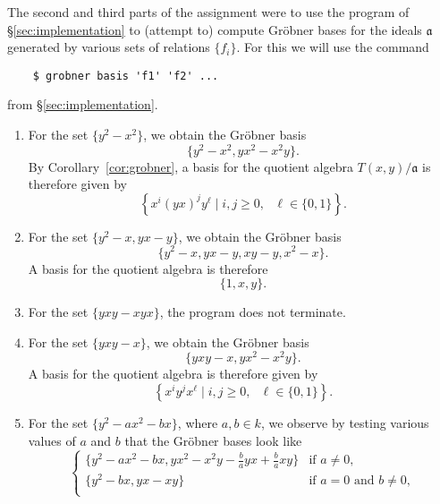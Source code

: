 The second and third parts of the assignment were to use the program of \S\ref{sec:implementation} to (attempt to) compute Gr\"obner bases for the ideals $\mathfrak{a}$ generated by various sets of relations $\{f_i\}$. For this we will use the command
\begin{verbatim}
	$ grobner basis 'f1' 'f2' ...
\end{verbatim}
from \S\ref{sec:implementation}.

\begin{enumerate}
	\item For the set $\{y^2-x^2\}$, we obtain the Gr\"obner basis
	\begin{equation*}
		\{y^2-x^2,yx^2-x^2y\}.
	\end{equation*}
    By Corollary~\ref{cor:grobner}, a basis for the quotient algebra $T(x,y)/\mathfrak{a}$ is therefore given by
    \begin{equation}
      \label{eqn:basisone}
    \left\{x^i(yx)^jy^\ell\mid i,j\ge 0,\text{ }\ell\in\{0,1\}\right\}.
    \end{equation}
	\item For the set $\{y^2-x,yx-y\}$, we obtain the Gr\"obner basis
    \begin{equation*}
      \{y^2 - x,yx - y,xy - y,x^2 - x\}.
    \end{equation*}
    A basis for the quotient algebra is therefore
    \begin{equation*}
      \{1,x,y\}.
    \end{equation*}
    \item For the set $\{yxy-xyx\}$, the program does not terminate.
	\item For the set $\{yxy-x\}$, we obtain the Gr\"obner basis
	\begin{equation*}
		\{yxy-x,yx^2-x^2y\}.
	\end{equation*}
    A basis for the quotient algebra is therefore given by
    \begin{equation*}
      \left\{x^iy^jx^\ell\mid i,j\ge 0,\text{ }\ell\in\{0,1\}\right\}.
    \end{equation*}
	\item For the set $\{y^2-ax^2-bx\}$, where $a,b\in k$, we observe by testing various values of $a$ and $b$ that the Gr\"obner bases look like
      \begin{equation*}
\begin{cases}
\{y^2-ax^2-bx,yx^2-x^2y-\frac{b}{a}yx+\frac{b}{a}xy\}&\text{if }a\ne 0,\\
\{y^2-bx,yx-xy\}&\text{if }a=0\text{ and }b\ne 0,\\

\end{cases}
\end{equation*}
\end{enumerate}
